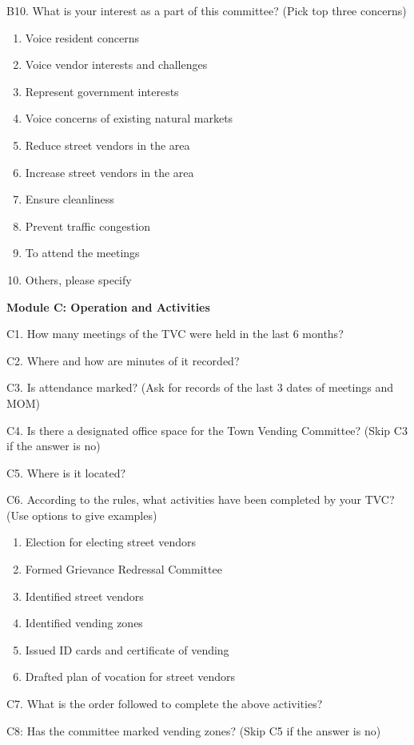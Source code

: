 \documentclass[a4paper, 12pt, twoside]{article}
\begin{document}
{{\begin{mdframed}[backgroundcolor=gray!20]
B10. What is your interest as a part of this committee? (Pick top three concerns)
\begin{enumerate}[nosep]
\item Voice resident concerns
\item Voice vendor interests and challenges
\item Represent government interests
\item Voice concerns of existing natural markets
\item Reduce street vendors in the area
\item Increase street vendors in the area
\item Ensure cleanliness
\item Prevent traffic congestion
\item To attend the meetings
\item Others, please specify
\end{enumerate}

\textbf{Module C: Operation and Activities}

C1. How many meetings of the TVC were held in the last 6 months?

C2. Where and how are minutes of it recorded?

C3. Is attendance marked? (Ask for records of the last 3 dates of meetings and MOM)

C4. Is there a designated office space for the Town Vending Committee? (Skip C3 if the answer is no)

C5. Where is it located?

C6. According to the rules, what activities have been completed by your TVC? (Use options to give examples)
\begin{enumerate}[nosep]
\item Election for electing street vendors
\item Formed Grievance Redressal Committee
\item Identified street vendors
\item Identified vending zones
\item Issued ID cards and certificate of vending
\item Drafted plan of vocation for street vendors
\end{enumerate}

C7. What is the order followed to complete the above activities?

C8: Has the committee marked vending zones? (Skip C5 if the answer is no)


\end{mdframed}}}
\end{document}

